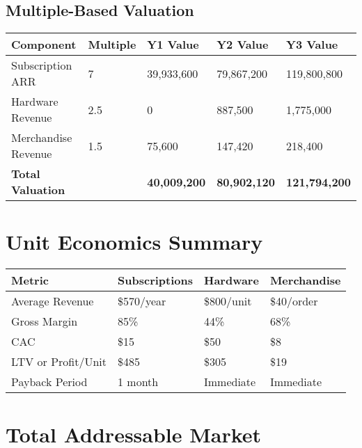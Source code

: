 \documentclass[11pt]{article}
\begin{document}
\subsection{Multiple-Based Valuation}
\begin{table}[H]
\centering
\begin{tabularx}{\linewidth}{l Y Y Y Y}
\toprule
Component & Multiple & Y1 Value & Y2 Value & Y3 Value \\\midrule
Subscription ARR & 7 & 39,933,600 & 79,867,200 & 119,800,800 \\
Hardware Revenue & 2.5 & 0 & 887,500 & 1,775,000 \\
Merchandise Revenue & 1.5 & 75,600 & 147,420 & 218,400 \\\midrule
\textbf{Total Valuation} &  & \textbf{40,009,200} & \textbf{80,902,120} & \textbf{121,794,200} \\
\bottomrule
\end{tabularx}
\end{table}

\section{Unit Economics Summary}

\begin{table}[H]
\centering
\begin{tabularx}{\linewidth}{l Y Y Y}
\toprule
Metric & Subscriptions & Hardware & Merchandise \\\midrule
Average Revenue & \$570/year & \$800/unit & \$40/order \\
Gross Margin & 85\% & 44\% & 68\% \\
CAC & \$15 & \$50 & \$8 \\
LTV or Profit/Unit & \$485 & \$305 & \$19 \\
Payback Period & 1 month & Immediate & Immediate \\
\bottomrule
\end{tabularx}
\end{table}

\section{Total Addressable Market}
\end{document}
